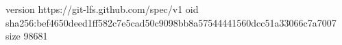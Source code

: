 version https://git-lfs.github.com/spec/v1
oid sha256:bef4650deed1ff582c7e5cad50c9098bb8a57544441560dcc51a33066c7a7007
size 98681
